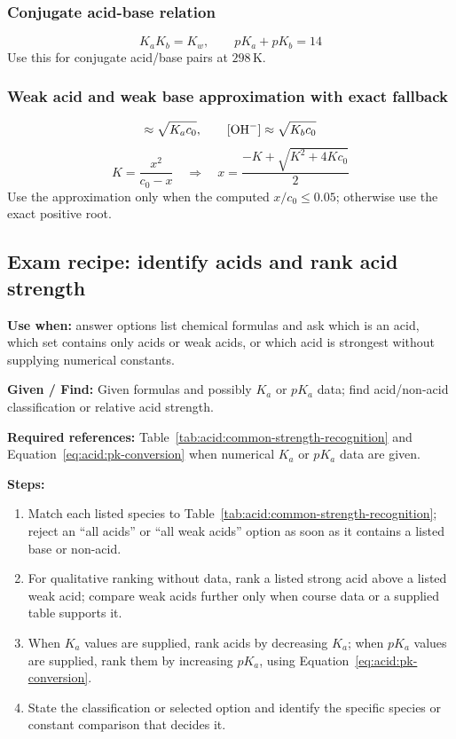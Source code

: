\subsubsection{Conjugate acid-base relation}
\begin{equation}
K_aK_b=K_w, \qquad pK_a+pK_b=14
\label{eq:acid:conjugate-relation}
\end{equation}
Use this for conjugate acid/base pairs at \(298\,\mathrm K\).

\subsubsection{Weak acid and weak base approximation with exact fallback}
\begin{equation}
[\ce{H3O+}]\approx\sqrt{K_ac_0}, \qquad
[\ce{OH-}]\approx\sqrt{K_bc_0}
\label{eq:acid:weak-approximation}
\end{equation}
\begin{equation}
K=\frac{x^2}{c_0-x}
\quad\Longrightarrow\quad
x=\frac{-K+\sqrt{K^2+4Kc_0}}{2}
\label{eq:acid:weak-exact-quadratic}
\end{equation}
Use the approximation only when the computed \(x/c_0\leq 0.05\); otherwise use the exact positive root.

\subsection{Exam recipe: identify acids and rank acid strength}
\textbf{Use when:} answer options list chemical formulas and ask which is an acid, which set contains only acids or weak acids, or which acid is strongest without supplying numerical constants.

\textbf{Given / Find:} Given formulas and possibly \(K_a\) or \(pK_a\) data; find acid/non-acid classification or relative acid strength.

\textbf{Required references:} Table~\ref{tab:acid:common-strength-recognition} and Equation~\eqref{eq:acid:pk-conversion} when numerical \(K_a\) or \(pK_a\) data are given.

\textbf{Steps:}
\begin{enumerate}
    \item Match each listed species to Table~\ref{tab:acid:common-strength-recognition}; reject an ``all acids'' or ``all weak acids'' option as soon as it contains a listed base or non-acid.
    \item For qualitative ranking without data, rank a listed strong acid above a listed weak acid; compare weak acids further only when course data or a supplied table supports it.
    \item When \(K_a\) values are supplied, rank acids by decreasing \(K_a\); when \(pK_a\) values are supplied, rank them by increasing \(pK_a\), using Equation~\eqref{eq:acid:pk-conversion}.
    \item State the classification or selected option and identify the specific species or constant comparison that decides it.
\end{enumerate}

